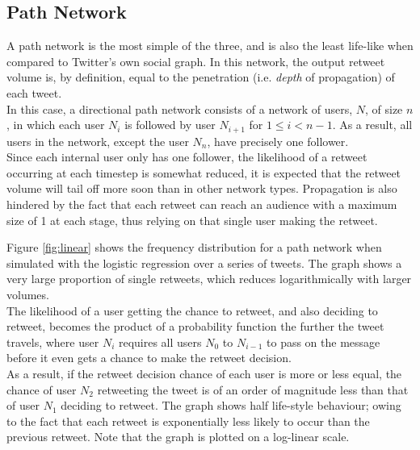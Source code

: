 \subsection{Path Network}
A path network is the most simple of the three, and is also the least life-like when compared to Twitter's own social graph. In this network, the output retweet volume is, by definition, equal to the penetration (i.e. \emph{depth} of propagation) of each tweet.
\\
In this case, a directional path network consists of a network of users, $ N $, of size $ n $, in which each user $ N_i $ is followed by user $ N_{i+1} $ for $ 1 \le i < n-1 $. As a result, all users in the network, except the user $ N_n $, have precisely one follower.
\\
Since each internal user only has one follower, the likelihood of a retweet occurring at each timestep is somewhat reduced, it is expected that the retweet volume will tail off more soon than in other network types. Propagation is also hindered by the fact that each retweet can reach an audience with a maximum size of 1 at each stage, thus relying on that single user making the retweet.
\begin{figure}[h]
\end{figure}
Figure \ref{fig:linear} shows the frequency distribution for a path network when simulated with the logistic regression over a series of tweets. The graph shows a very large proportion of single retweets, which reduces logarithmically with larger volumes.
\\
The likelihood of a user getting the chance to retweet, and also deciding to retweet, becomes the product of a probability function the further the tweet travels, where user $ N_i $ requires all users $ N_0 $ to $ N_{i-1} $ to pass on the message before it even gets a chance to make the retweet decision.
\\
As a result, if the retweet decision chance of each user is more or less equal, the chance of user $ N_2  $ retweeting the tweet is of an order of magnitude less than that of user $ N_1 $ deciding to retweet. The graph shows half life-style behaviour; owing to the fact that each retweet is exponentially less likely to occur than the previous retweet. Note that the graph is plotted on a log-linear scale.

